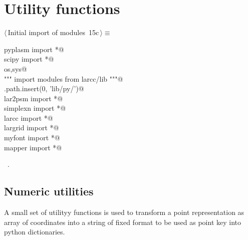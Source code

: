 \documentclass[11pt,oneside]{article}	%
\begin{document}
\section{Utility functions}
\begin{flushleft} \small \label{scrap26}
\protect{}$\langle\,$Initial import of modules\nobreak\ {\footnotesize 15c}$\,\rangle\equiv$
\vspace{-1ex}
\begin{list}{}{} \item
\mbox{}\verb@from pyplasm import *@\\
\mbox{}\verb@from scipy import *@\\
\mbox{}\verb@import os,sys@\\
\mbox{}\verb@""" import modules from larcc/lib """@\\
\mbox{}\verb@sys.path.insert(0, 'lib/py/')@\\
\mbox{}\verb@from lar2psm import *@\\
\mbox{}\verb@from simplexn import *@\\
\mbox{}\verb@from larcc import *@\\
\mbox{}\verb@from largrid import *@\\
\mbox{}\verb@from myfont import *@\\
\mbox{}\verb@from mapper import *@\\
\mbox{}\verb@@{\NWsep}
\end{list}
\vspace{-1ex}
\footnotesize\addtolength{\baselineskip}{-1ex}
\begin{list}{}{\setlength{\itemsep}{-\parsep}\setlength{\itemindent}{-\leftmargin}}
\item \NWtxtMacroRefIn\ .
\end{list}
\end{flushleft}
\subsection{Numeric utilities}

A small set of utilityy functions is used to transform a point representation as array of coordinates into a string of fixed format to be used as point key into python dictionaries.
\end{document}
